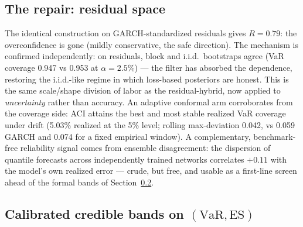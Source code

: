 \documentclass[11pt]{article}
\newcommand{\VaR}{\mathrm{VaR}}
\newcommand{\ES}{\mathrm{ES}}
\theoremstyle{remark}
\begin{document}
\subsection{The repair: residual space}

The identical construction on GARCH-standardized residuals gives $R =
0.79$: the overconfidence is gone (mildly conservative, the safe
direction). The mechanism is confirmed independently: on residuals,
block and i.i.d.\ bootstraps agree (VaR coverage 0.947 vs 0.953 at
$\alpha=2.5\%$) --- the filter has absorbed the dependence, restoring
the i.i.d.-like regime in which loss-based posteriors are honest. This
is the same scale/shape division of labor as the residual-hybrid, now
applied to \emph{uncertainty} rather than accuracy. An adaptive conformal
arm \citep{gibbs2021aci} corroborates from the coverage side: ACI attains
the best and most stable realized VaR coverage under drift (5.03\%
realized at the 5\% level; rolling max-deviation 0.042, vs 0.059 GARCH
and 0.074 for a fixed empirical window). A complementary, benchmark-free
reliability signal comes from ensemble disagreement: the dispersion of
quantile forecasts across independently trained networks correlates
$+0.11$ with the model's own realized error --- crude, but free, and
usable as a first-line screen ahead of the formal bands of
Section~\ref{sec:bands}.

\subsection{Calibrated credible bands on $(\VaR, \ES)$}\label{sec:bands}
\end{document}
